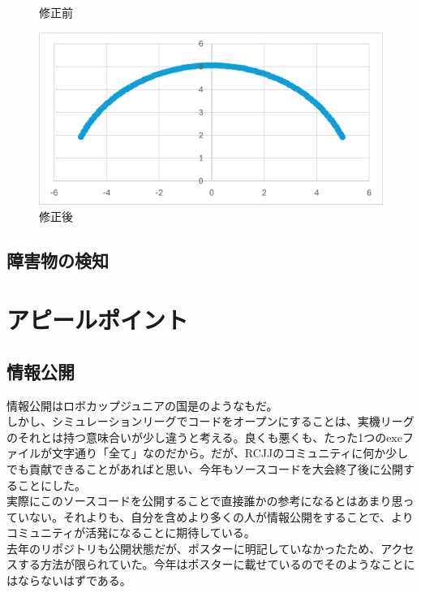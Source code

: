 \documentclass[dvipdfmx,a4paper]{jsarticle}
\begin{document}
\begin{figure}[H]
\begin{minipage}[b]{0.45\linewidth}
        \caption{修正前}
      \end{minipage}
      \begin{minipage}[b]{0.45\linewidth}
        \centering
        \includegraphics[keepaspectratio, scale=0.5]{Photo/画像2.png}
        \caption{修正後}
      \end{minipage}
    \end{figure}

    \subsection{障害物の検知}

  \section{アピールポイント}
    \subsection{情報公開}
    情報公開はロボカップジュニアの国是のようなもだ。\\
    しかし、シミュレーションリーグでコードをオープンにすることは、実機リーグのそれとは持つ意味合いが少し違うと考える。良くも悪くも、たった1つのexeファイルが文字通り「全て」なのだから。だが、RCJJのコミュニティに何か少しでも貢献できることがあればと思い、今年もソースコードを大会終了後に公開することにした。\\
    実際にこのソースコードを公開することで直接誰かの参考になるとはあまり思っていない。それよりも、自分を含めより多くの人が情報公開をすることで、よりコミュニティが活発になることに期待している。\\

    去年のリポジトリも公開状態だが、ポスターに明記していなかったため、アクセスする方法が限られていた。今年はポスターに載せているのでそのようなことにはならないはずである。\\
    
\end{document}
